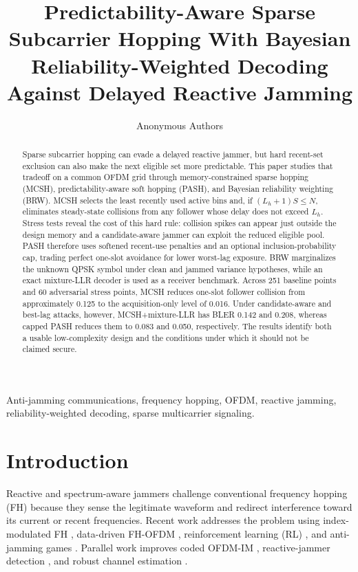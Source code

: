 \documentclass[journal,10pt]{IEEEtran}
\title{Predictability-Aware Sparse Subcarrier Hopping With Bayesian
Reliability-Weighted Decoding Against Delayed Reactive Jamming}
\author{Anonymous Authors}
\begin{document}
\maketitle

\begin{abstract}
Sparse subcarrier hopping can evade a delayed reactive jammer, but hard
recent-set exclusion can also make the next eligible set more predictable. This
paper studies that tradeoff on a common OFDM grid through memory-constrained
sparse hopping (MCSH), predictability-aware soft hopping (PASH), and Bayesian
reliability weighting (BRW). MCSH selects the least recently used active bins
and, if $(L_h+1)S\leq N$, eliminates steady-state collisions from any follower
whose delay does not exceed $L_h$. Stress tests reveal the cost of this hard
rule: collision spikes can appear just outside the design memory and a
candidate-aware jammer can exploit the reduced eligible pool. PASH therefore
uses softened recent-use penalties and an optional inclusion-probability cap,
trading perfect one-slot avoidance for lower worst-lag exposure. BRW
marginalizes the unknown QPSK symbol under clean and jammed variance
hypotheses, while an exact mixture-LLR decoder is used as a receiver benchmark.
Across 251 baseline points and 60 adversarial stress points, MCSH reduces
one-slot follower collision from approximately 0.125 to the acquisition-only
level of 0.016. Under candidate-aware and best-lag attacks, however,
MCSH+mixture-LLR has BLER 0.142 and 0.208, whereas capped PASH reduces them to
0.083 and 0.050, respectively. The results identify both a usable
low-complexity design and the conditions under which it should not be claimed
secure.
\end{abstract}

\begin{IEEEkeywords}
Anti-jamming communications, frequency hopping, OFDM, reactive jamming,
reliability-weighted decoding, sparse multicarrier signaling.
\end{IEEEkeywords}

\section{Introduction}
Reactive and spectrum-aware jammers challenge conventional frequency hopping
(FH) because they sense the legitimate waveform and redirect interference
toward its current or recent frequencies. Recent work addresses the problem
using index-modulated FH \cite{shi2021,shi2022enhanced}, data-driven FH-OFDM
\cite{zhou2024}, reinforcement learning (RL) \cite{zhang2024block,qi2024,cheng2025},
and anti-jamming games \cite{zhang2024game}. Parallel work improves coded
OFDM-IM \cite{kaplan2023,chen2023}, reactive-jammer detection
\cite{altun2022reactive,li2024,wesolowski2023detection}, and robust channel
estimation \cite{mendonca2024channel}.
\end{document}
